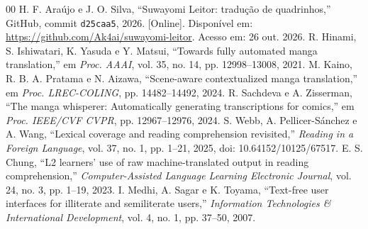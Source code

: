 \documentclass[conference]{IEEEtran}
\newcommand{\code}[1]{\texttt{#1}}
\begin{document}
\begin{thebibliography}{00}
 H. F. Araújo e J. O. Silva, ``Suwayomi Leitor: tradução de quadrinhos,'' GitHub, commit \code{d25caa5}, 2026. [Online]. Disponível em: \url{https://github.com/Ak4ai/suwayomi-leitor}. Acesso em: 26 out. 2026.
 R. Hinami, S. Ishiwatari, K. Yasuda e Y. Matsui, ``Towards fully automated manga translation,'' em \emph{Proc. AAAI}, vol. 35, no. 14, pp. 12998--13008, 2021.
 M. Kaino, R. B. A. Pratama e N. Aizawa, ``Scene-aware contextualized manga translation,'' em \emph{Proc. LREC-COLING}, pp. 14482--14492, 2024.
 R. Sachdeva e A. Zisserman, ``The manga whisperer: Automatically generating transcriptions for comics,'' em \emph{Proc. IEEE/CVF CVPR}, pp. 12967--12976, 2024.
 S. Webb, A. Pellicer-Sánchez e A. Wang, ``Lexical coverage and reading comprehension revisited,'' \emph{Reading in a Foreign Language}, vol. 37, no. 1, pp. 1--21, 2025, doi: 10.64152/10125/67517.
 E. S. Chung, ``L2 learners' use of raw machine-translated output in reading comprehension,'' \emph{Computer-Assisted Language Learning Electronic Journal}, vol. 24, no. 3, pp. 1--19, 2023.
 I. Medhi, A. Sagar e K. Toyama, ``Text-free user interfaces for illiterate and semiliterate users,'' \emph{Information Technologies \& International Development}, vol. 4, no. 1, pp. 37--50, 2007.
\end{thebibliography}
\end{document}
